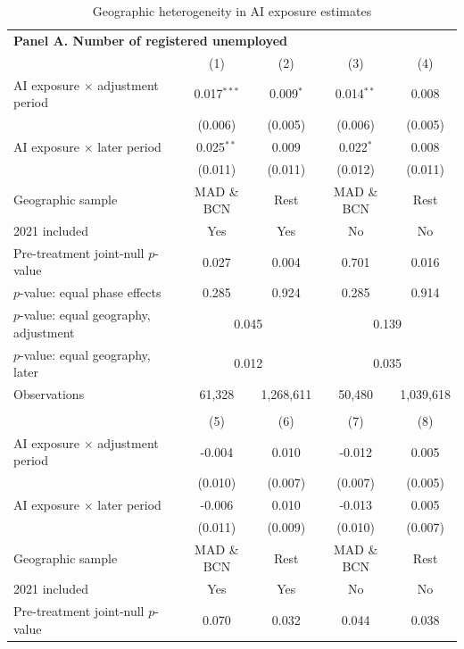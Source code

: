 \begin{table}[!t]
\centering
\caption{Geographic heterogeneity in AI exposure estimates}
\label{tab:v1_main_provinces}
\begin{threeparttable}
\small
\setlength{\tabcolsep}{5pt}
\begin{tabular}{@{}lcccc@{}}
\toprule
\multicolumn{5}{l}{\textbf{Panel A. Number of registered unemployed}} \\
 & (1) & (2) & (3) & (4) \\
\midrule
AI exposure $\times$ adjustment period & 0.017$^{***}$ & 0.009$^{*}$ & 0.014$^{**}$ & 0.008 \\
 & (0.006) & (0.005) & (0.006) & (0.005) \\
AI exposure $\times$ later period & 0.025$^{**}$ & 0.009 & 0.022$^{*}$ & 0.008 \\
 & (0.011) & (0.011) & (0.012) & (0.011) \\
\midrule
Geographic sample & MAD \& BCN & Rest & MAD \& BCN & Rest \\
2021 included & Yes & Yes & No & No \\
Pre-treatment joint-null $p$-value & 0.027 & 0.004 & 0.701 & 0.016 \\
$p$-value: equal phase effects & 0.285 & 0.924 & 0.285 & 0.914 \\
$p$-value: equal geography, adjustment & \multicolumn{2}{c}{0.045} & \multicolumn{2}{c}{0.139} \\
$p$-value: equal geography, later & \multicolumn{2}{c}{0.012} & \multicolumn{2}{c}{0.035} \\
Observations & 61,328 & 1,268,611 & 50,480 & 1,039,618 \\
\addlinespace[6pt]
\midrule
\multicolumn{5}{l}{\textbf{Panel B. Number of new contracts}} \\
 & (5) & (6) & (7) & (8) \\
\midrule
AI exposure $\times$ adjustment period & -0.004 & 0.010 & -0.012 & 0.005 \\
 & (0.010) & (0.007) & (0.007) & (0.005) \\
AI exposure $\times$ later period & -0.006 & 0.010 & -0.013 & 0.005 \\
 & (0.011) & (0.009) & (0.010) & (0.007) \\
\midrule
Geographic sample & MAD \& BCN & Rest & MAD \& BCN & Rest \\
2021 included & Yes & Yes & No & No \\
Pre-treatment joint-null $p$-value & 0.070 & 0.032 & 0.044 & 0.038 \\

\end{tabular}
\end{threeparttable}
\end{table}

